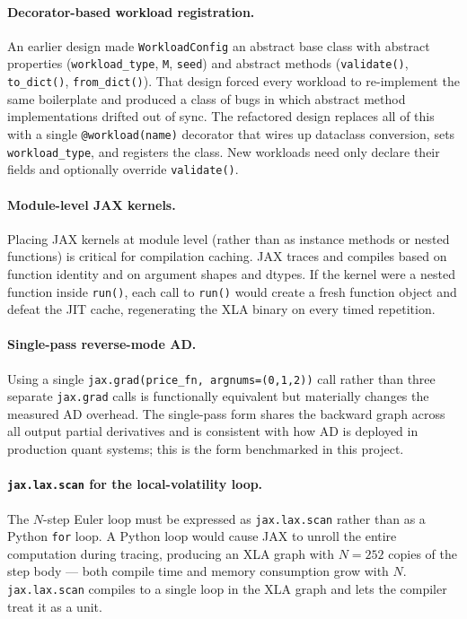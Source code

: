 \paragraph{Decorator-based workload registration.}
An earlier design made \texttt{WorkloadConfig} an abstract base class with
abstract properties (\texttt{workload\_type}, \texttt{M}, \texttt{seed}) and
abstract methods (\texttt{validate()}, \texttt{to\_dict()}, \texttt{from\_dict()}).
That design forced every workload to re-implement the same boilerplate and
produced a class of bugs in which abstract method implementations drifted out
of sync. The refactored design replaces all of this with a single
\texttt{@workload(name)} decorator that wires up dataclass conversion, sets
\texttt{workload\_type}, and registers the class. New workloads need only declare
their fields and optionally override \texttt{validate()}.

\paragraph{Module-level JAX kernels.}
Placing JAX kernels at module level (rather than as instance methods or nested
functions) is critical for compilation caching. JAX traces and compiles based
on function identity and on argument shapes and dtypes. If the kernel were a
nested function inside \texttt{run()}, each call to \texttt{run()} would create
a fresh function object and defeat the JIT cache, regenerating the XLA binary
on every timed repetition.

\paragraph{Single-pass reverse-mode AD.}
Using a single \texttt{jax.grad(price\_fn, argnums=(0,1,2))} call rather than
three separate \texttt{jax.grad} calls is functionally equivalent but materially
changes the measured AD overhead. The single-pass form shares the backward
graph across all output partial derivatives and is consistent with how AD is
deployed in production quant systems; this is the form benchmarked in this
project.

\paragraph{\texttt{jax.lax.scan} for the local-volatility loop.}
The $N$-step Euler loop must be expressed as \texttt{jax.lax.scan} rather than
as a Python \texttt{for} loop. A Python loop would cause JAX to unroll the
entire computation during tracing, producing an XLA graph with $N=252$ copies
of the step body --- both compile time and memory consumption grow with $N$.
\texttt{jax.lax.scan} compiles to a single loop in the XLA graph and lets the
compiler treat it as a unit.

